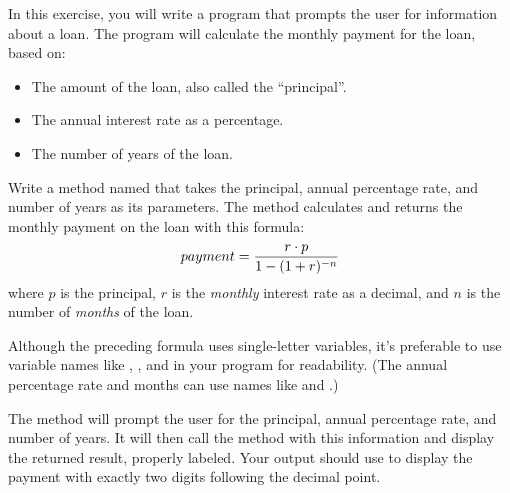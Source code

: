 \begin{exercise}
In this exercise, you will write a program that prompts the user for information about a loan. The program will calculate the monthly payment for the loan, based on:
\begin{itemize}
\item The amount of the loan, also called the ``principal''.
\item The annual interest rate as a percentage.
\item The number of years of the loan.
\end{itemize}

Write a method named  that takes the principal, annual percentage rate, and number of years as its parameters. The method calculates and returns the monthly payment on the loan with this formula:
\begin{equation*}
payment = {{r\cdot p}\over {1-(1+r)^{-n}}}
\end{equation*}
where $p$ is the principal, $r$ is the {\em monthly} interest rate as a decimal, and $n$ is the number of {\em months} of the loan.

Although the preceding formula uses single-letter variables, it's preferable to use variable names like , , and  in your program for readability. (The annual percentage rate and months can use names like  and .)

The  method will prompt the user for the principal, annual percentage rate, and number of years. It will then call the  method with this information and display the returned result, properly labeled. Your output should use  to display the payment with exactly two digits following the decimal point.
\end{exercise}


